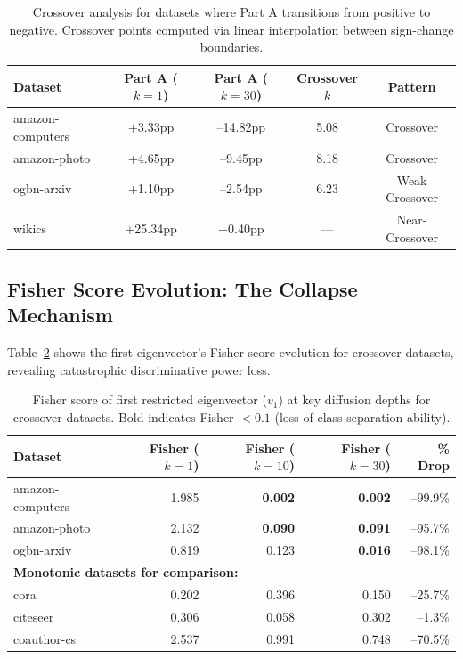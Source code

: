 \documentclass[11pt]{article}
\begin{document}
\begin{table}[h]
\centering
\caption{Crossover analysis for datasets where Part A transitions from positive to negative. Crossover points computed via linear interpolation between sign-change boundaries.}
\label{tab:crossover}
\begin{tabular}{lcccc}
\toprule
\textbf{Dataset} & \textbf{Part A ($k{=}1$)} & \textbf{Part A ($k{=}30$)} & \textbf{Crossover $k$} & \textbf{Pattern} \\
\midrule
amazon-computers & +3.33pp  & --14.82pp & 5.08 & Crossover \\
amazon-photo     & +4.65pp  & --9.45pp  & 8.18 & Crossover \\
ogbn-arxiv       & +1.10pp  & --2.54pp  & 6.23 & Weak Crossover \\
\midrule
wikics           & +25.34pp & +0.40pp   & --- & Near-Crossover \\
\bottomrule
\end{tabular}
\end{table}

\subsection{Fisher Score Evolution: The Collapse Mechanism}

Table~\ref{tab:fisher_collapse} shows the first eigenvector's Fisher score evolution for crossover datasets, revealing catastrophic discriminative power loss.

\begin{table}[h]
\centering
\caption{Fisher score of first restricted eigenvector ($v_1$) at key diffusion depths for crossover datasets. Bold indicates Fisher $< 0.1$ (loss of class-separation ability).}
\label{tab:fisher_collapse}
\begin{tabular}{lrrrr}
\toprule
\textbf{Dataset} & \textbf{Fisher ($k{=}1$)} & \textbf{Fisher ($k{=}10$)} & \textbf{Fisher ($k{=}30$)} & \textbf{\% Drop} \\
\midrule
amazon-computers & 1.985 & \textbf{0.002} & \textbf{0.002} & --99.9\% \\
amazon-photo     & 2.132 & \textbf{0.090} & \textbf{0.091} & --95.7\% \\
ogbn-arxiv       & 0.819 & 0.123          & \textbf{0.016} & --98.1\% \\
\midrule
\multicolumn{5}{l}{\textbf{Monotonic datasets for comparison:}} \\
cora             & 0.202 & 0.396          & 0.150          & --25.7\% \\
citeseer         & 0.306 & 0.058          & 0.302          & --1.3\%  \\
coauthor-cs      & 2.537 & 0.991          & 0.748          & --70.5\% \\
\bottomrule
\end{tabular}
\end{table}
\end{document}
